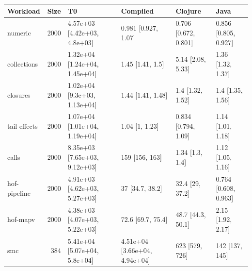 \begin{tabular}{lrllll}
\toprule Workload & Size & T0 & Compiled & Clojure & Java \\
\midrule
numeric & 2000 & 4.57e+03 [4.42e+03, 4.8e+03] & 0.981 [0.927, 1.07] & 0.706 [0.672, 0.801] & 0.856 [0.805, 0.927] \\
collections & 2000 & 1.32e+04 [1.24e+04, 1.45e+04] & 1.45 [1.41, 1.5] & 5.14 [2.08, 5.33] & 1.36 [1.32, 1.37] \\
closures & 2000 & 1.02e+04 [9.3e+03, 1.13e+04] & 1.44 [1.41, 1.48] & 1.4 [1.32, 1.52] & 1.4 [1.35, 1.56] \\
tail-effects & 2000 & 1.07e+04 [1.01e+04, 1.19e+04] & 1.04 [1, 1.23] & 0.834 [0.794, 1.09] & 1.14 [1.01, 1.18] \\
calls & 2000 & 8.35e+03 [7.65e+03, 9.12e+03] & 159 [156, 163] & 1.34 [1.3, 1.4] & 1.12 [1.05, 1.16] \\
hof-pipeline & 2000 & 4.91e+03 [4.62e+03, 5.27e+03] & 37 [34.7, 38.2] & 32.4 [29, 37.2] & 0.764 [0.608, 0.963] \\
hof-mapv & 2000 & 4.38e+03 [4.07e+03, 5.22e+03] & 72.6 [69.7, 75.4] & 48.7 [44.3, 50.1] & 2.15 [1.92, 2.17] \\
smc & 384 & 5.41e+04 [5.07e+04, 5.8e+04] & 4.51e+04 [3.66e+04, 4.94e+04] & 623 [579, 726] & 142 [137, 145] \\
\bottomrule
\end{tabular}
